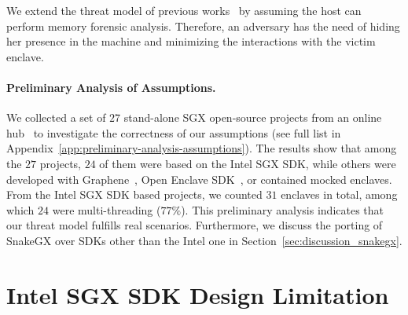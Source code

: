 We extend the threat model of previous works~\cite{biondo2018guard} 
by assuming the host can perform memory forensic analysis.
Therefore, an adversary has the need of hiding her presence in the machine 
and minimizing the interactions with the victim enclave.

\paragraph{\textbf{Preliminary Analysis of Assumptions.}}
We collected a set of $27$ stand-alone SGX open-source projects from an online 
hub~\cite{asop} to investigate the correctness of our assumptions (see full 
list in Appendix~\ref{app:preliminary-analysis-assumptions}).
The results show that among the $27$ projects, $24$ of them were based on the 
Intel SGX SDK, while others were developed with Graphene~\cite{203255}, Open 
Enclave SDK~\cite{openenclave}, or contained mocked enclaves.
From the Intel SGX SDK based projects, we counted $31$ enclaves in total, 
among which $24$ were multi-threading ($77\%$).
This preliminary analysis indicates that our threat model fulfills 
real scenarios.
Furthermore, we discuss the porting of SnakeGX over SDKs other than the Intel 
one in Section~\ref{sec:discussion_snakegx}.

\section{Intel SGX SDK Design Limitation}
\label{sec:sgx-internal}


